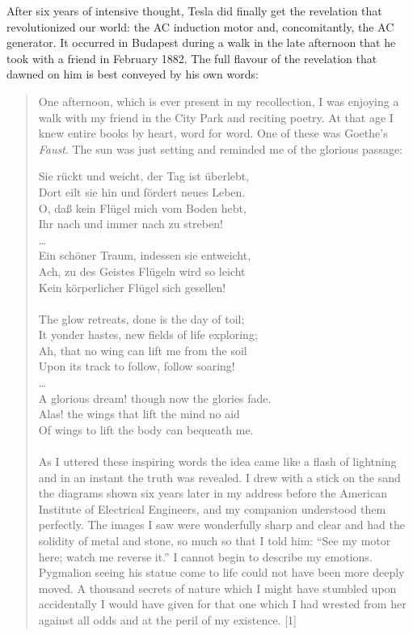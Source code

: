 \documentclass[
  11pt,
  a4paper,
]{article}
\begin{document}
After six years of intensive thought, Tesla did finally get the
revelation that revolutionized our world: the AC induction motor and,
concomitantly, the AC generator. It occurred in Budapest during a walk
in the late afternoon that he took with a friend in February 1882. The
full flavour of the revelation that dawned on him is best conveyed by
his own words:

\begin{quote}
One afternoon, which is ever present in my recollection, I was enjoying
a walk with my friend in the City Park and reciting poetry. At that age
I knew entire books by heart, word for word. One of these was Goethe's
\emph{Faust}. The sun was just setting and reminded me of the glorious
passage:

Sie rückt und weicht, der Tag ist überlebt,\\
Dort eilt sie hin und fördert neues Leben.\\
O, daß kein Flügel mich vom Boden hebt,\\
Ihr nach und immer nach zu streben!\\
\ldots{}\\
Ein schöner Traum, indessen sie entweicht,\\
Ach, zu des Geistes Flügeln wird so leicht\\
Kein körperlicher Flügel sich gesellen!\\
~\\
The glow retreats, done is the day of toil;\\
It yonder hastes, new fields of life exploring;\\
Ah, that no wing can lift me from the soil\\
Upon its track to follow, follow soaring!\\
\ldots{}\\
A glorious dream! though now the glories fade.\\
Alas! the wings that lift the mind no aid\\
Of wings to lift the body can bequeath me.\\
~\\

As I uttered these inspiring words the idea came like a flash of
lightning and in an instant the truth was revealed. I drew with a stick
on the sand the diagrams shown six years later in my address before the
American Institute of Electrical Engineers, and my companion understood
them perfectly. The images I saw were wonderfully sharp and clear and
had the solidity of metal and stone, so much so that I told him: ``See
my motor here; watch me reverse it.'' I cannot begin to describe my
emotions. Pygmalion seeing his statue come to life could not have been
more deeply moved. A thousand secrets of nature which I might have
stumbled upon accidentally I would have given for that one which I had
wrested from her against all odds and at the peril of my existence.
{[}1{]}
\end{quote}
\end{document}

